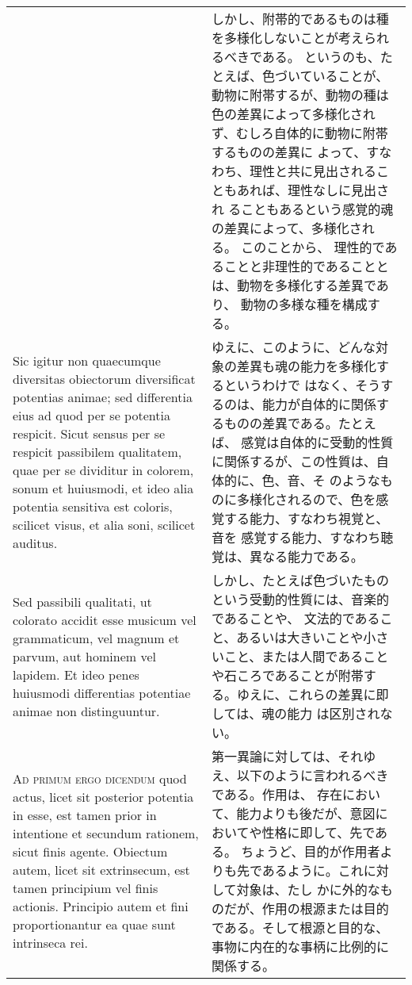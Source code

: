 \documentclass[paper=a4paper,fontsize=10pt,jafontsize=9pt,titlepage]{jlreq}
\begin{document}
\begin{longtable}{p{21em}p{21em}}
&

しかし、附帯的であるものは種を多様化しないことが考えられるべきである。
というのも、たとえば、色づいていることが、動物に附帯するが、動物の種は
色の差異によって多様化されず、むしろ自体的に動物に附帯するものの差異に
よって、すなわち、理性と共に見出されることもあれば、理性なしに見出され
ることもあるという感覚的魂の差異によって、多様化される。 このことから、
理性的であることと非理性的であることとは、動物を多様化する差異であり、
動物の多様な種を構成する。


\\

 Sic igitur non quaecumque diversitas obiectorum diversificat
 potentias animae; sed differentia eius ad quod per se potentia
 respicit. Sicut sensus per se respicit passibilem qualitatem, quae
 per se dividitur in colorem, sonum et huiusmodi, et ideo alia
 potentia sensitiva est coloris, scilicet visus, et alia soni,
 scilicet auditus.
 
&

ゆえに、このように、どんな対象の差異も魂の能力を多様化するというわけで
はなく、そうするのは、能力が自体的に関係するものの差異である。たとえば、
感覚は自体的に受動的性質に関係するが、この性質は、自体的に、色、音、そ
のようなものに多様化されるので、色を感覚する能力、すなわち視覚と、音を
感覚する能力、すなわち聴覚は、異なる能力である。

\\

 Sed passibili qualitati, ut colorato accidit esse musicum vel
 grammaticum, vel magnum et parvum, aut hominem vel lapidem. Et ideo
 penes huiusmodi differentias potentiae animae non distinguuntur.

 
&

しかし、たとえば色づいたものという受動的性質には、音楽的であることや、
文法的であること、あるいは大きいことや小さいこと、または人間であること
や石ころであることが附帯する。ゆえに、これらの差異に即しては、魂の能力
 は区別されない。
 
\\


 {\scshape Ad primum ergo dicendum} quod actus, licet sit posterior
 potentia in esse, est tamen prior in intentione et secundum rationem,
 sicut finis agente. Obiectum autem, licet sit extrinsecum, est tamen
 principium vel finis actionis. Principio autem et fini
 proportionantur ea quae sunt intrinseca rei.

 
&

 第一異論に対しては、それゆえ、以下のように言われるべきである。作用は、
 存在において、能力よりも後だが、意図においてや性格に即して、先である。
 ちょうど、目的が作用者よりも先であるように。これに対して対象は、たし
 かに外的なものだが、作用の根源または目的である。そして根源と目的な、
 事物に内在的な事柄に比例的に関係する。



\end{longtable}
\end{document}
